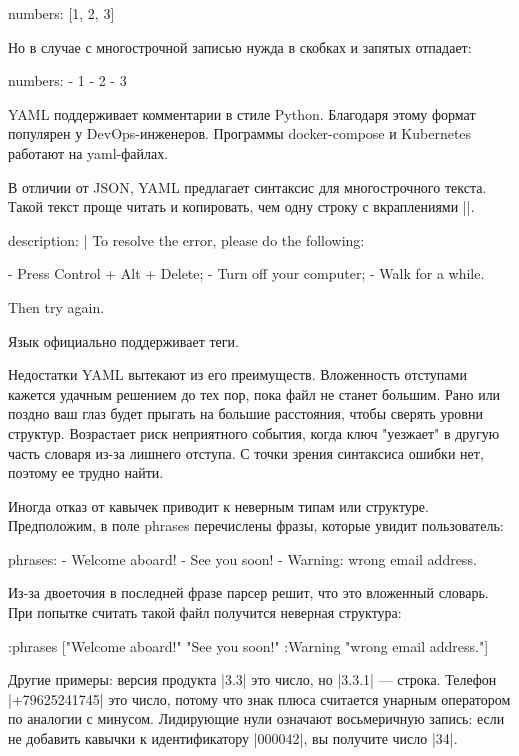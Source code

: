 \begin{code}
numbers: [1, 2, 3]
\end{code}

Но в случае с многострочной записью нужда в скобках и запятых отпадает:

\begin{code}
numbers:
  - 1
  - 2
  - 3
\end{code}

YAML поддерживает комментарии в стиле Python. Благодаря этому формат популярен у
DevOps-инженеров. Программы docker-compose и Kubernetes работают на yaml-файлах.

В отличии от JSON, YAML предлагает синтаксис для многострочного текста. Такой
текст проще читать и копировать, чем одну строку с вкраплениями \spverb|\n|.

\begin{code}
description: |
  To resolve the error, please do the following:

  - Press Control + Alt + Delete;
  - Turn off your computer;
  - Walk for a while.

  Then try again.
\end{code}

Язык официально поддерживает теги.

Недостатки YAML вытекают из его преимуществ. Вложенность отступами кажется
удачным решением до тех пор, пока файл не станет большим. Рано или поздно ваш
глаз будет прыгать на большие расстояния, чтобы сверять уровни
структур. Возрастает риск неприятного события, когда ключ "уезжает" в другую
часть словаря из-за лишнего отступа. С точки зрения синтаксиса ошибки нет,
поэтому ее трудно найти.

Иногда отказ от кавычек приводит к неверным типам или структуре. Предположим, в
поле phrases перечислены фразы, которые увидит пользователь:

\begin{code}
phrases:
  - Welcome aboard!
  - See you soon!
  - Warning: wrong email address.
\end{code}

Из-за двоеточия в последней фразе парсер решит, что это вложенный словарь. При
попытке считать такой файл получится неверная структура:

\begin{code}
{:phrases
 ["Welcome aboard!"
  "See you soon!"
  {:Warning "wrong email address."}]}
\end{code}

Другие примеры: версия продукта \spverb|3.3| это число, но \spverb|3.3.1| — строка. Телефон
\spverb|+79625241745| это число, потому что знак плюса считается унарным оператором по
аналогии с минусом. Лидирующие нули означают восьмеричную запись: если не
добавить кавычки к идентификатору \spverb|000042|, вы получите число \spverb|34|.

